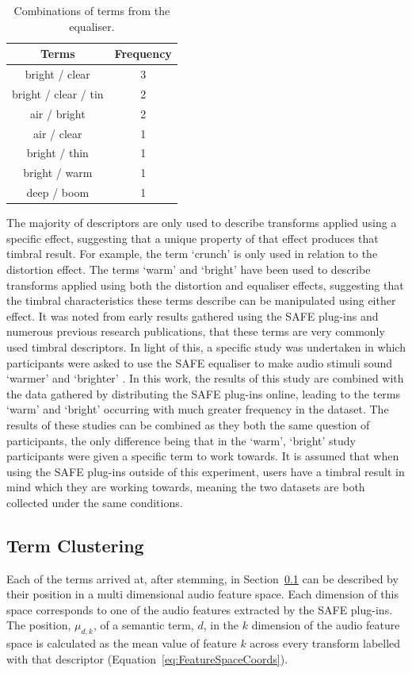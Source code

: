 		\begin{table}[h!]
			\centering
			\begin{tabular}{|c|c|}
				\hline
				\bf{Terms} & \bf{Frequency} \tabularnewline
				\hline
				\hline
				bright / clear & 3 \tabularnewline
				\hline
				bright / clear / tin & 2 \tabularnewline
				\hline
				air / bright & 2 \tabularnewline
				\hline
				air / clear & 1 \tabularnewline
				\hline
				bright / thin & 1 \tabularnewline
				\hline
				bright / warm & 1 \tabularnewline
				\hline
				deep / boom & 1 \tabularnewline
				\hline
			\end{tabular}
			\caption{Combinations of terms from the equaliser.}
			\label{tab:EqualiserTermCombinations}
		\end{table}

		The majority of descriptors are only used to describe transforms applied using a specific effect,
		suggesting that a unique property of that effect produces that timbral result. For example, the term
		`crunch' is only used in relation to the distortion effect. The terms `warm' and `bright' have been used to
		describe transforms applied using both the distortion and equaliser effects, suggesting that the timbral
		characteristics these terms describe can be manipulated using either effect. It was noted from early
		results gathered using the SAFE plug-ins and numerous previous research publications, that these terms are
		very commonly used timbral descriptors. In light of this, a specific study was undertaken in which
		participants were asked to use the SAFE equaliser to make audio stimuli sound `warmer' and `brighter'
		\citep{stasis2015a}. In this work, the results of this study are combined with the data gathered by
		distributing the SAFE plug-ins online, leading to the terms `warm' and `bright' occurring with much greater
		frequency in the dataset. The results of these studies can be combined as they both the same question of
		participants, the only difference being that in the `warm', `bright' study participants were given a
		specific term to work towards. It is assumed that when using the SAFE plug-ins outside of this experiment,
		users have a timbral result in mind which they are working towards, meaning the two datasets are both
		collected under the same conditions.
		
	\subsection{Term Clustering}
	\label{sec:TimbreEvaluation-Analysis-TermClustering}
		Each of the terms arrived at, after stemming, in Section~\ref{sec:TimbreEvaluation-Analysis-TermClustering}
		can be described by their position in a multi dimensional audio feature space. Each dimension of this space
		corresponds to one of the audio features extracted by the SAFE plug-ins. The position, $\mu_{d,k}$, of a
		semantic term, $d$, in the $k$ dimension of the audio feature space is calculated as the mean
		value of feature $k$ across every transform labelled with that descriptor
		(Equation~\ref{eq:FeatureSpaceCoords}).

